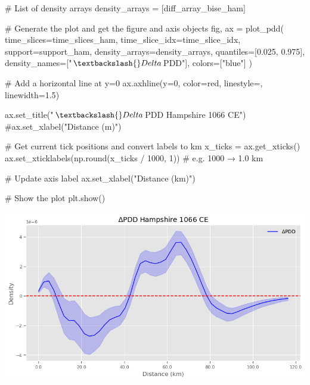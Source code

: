 \documentclass[
  11pt,
  letterpaper,
  DIV=11,
  numbers=noendperiod]{scrartcl}
\newenvironment{Shaded}{\begin{snugshade}}{\end{snugshade}}
\newcommand{\BuiltInTok}[1]{\textcolor[rgb]{0.00,0.23,0.31}{#1}}
\newcommand{\CommentTok}[1]{\textcolor[rgb]{0.37,0.37,0.37}{#1}}
\newcommand{\DecValTok}[1]{\textcolor[rgb]{0.68,0.00,0.00}{#1}}
\newcommand{\FloatTok}[1]{\textcolor[rgb]{0.68,0.00,0.00}{#1}}
\newcommand{\NormalTok}[1]{\textcolor[rgb]{0.00,0.23,0.31}{#1}}
\newcommand{\OperatorTok}[1]{\textcolor[rgb]{0.37,0.37,0.37}{#1}}
\newcommand{\StringTok}[1]{\textcolor[rgb]{0.13,0.47,0.30}{#1}}
\begin{document}
\begin{Shaded}
\begin{Highlighting}[]
\CommentTok{\# List of density arrays}
\NormalTok{density\_arrays }\OperatorTok{=}\NormalTok{ [diff\_array\_bise\_ham]}

\CommentTok{\# Generate the plot and get the figure and axis objects}
\NormalTok{fig, ax }\OperatorTok{=}\NormalTok{ plot\_pdd(}
\NormalTok{    time\_slices}\OperatorTok{=}\NormalTok{time\_slices\_ham,}
\NormalTok{    time\_slice\_idx}\OperatorTok{=}\NormalTok{time\_slice\_idx,}
\NormalTok{    support}\OperatorTok{=}\NormalTok{support\_ham,}
\NormalTok{    density\_arrays}\OperatorTok{=}\NormalTok{density\_arrays,}
\NormalTok{    quantiles}\OperatorTok{=}\NormalTok{[}\FloatTok{0.025}\NormalTok{, }\FloatTok{0.975}\NormalTok{],}
\NormalTok{    density\_names}\OperatorTok{=}\NormalTok{[}\StringTok{"$\textbackslash{}Delta$PDD"}\NormalTok{],}
\NormalTok{    colors}\OperatorTok{=}\NormalTok{[}\StringTok{"blue"}\NormalTok{]}
\NormalTok{)}

\CommentTok{\# Add a horizontal line at y=0}
\NormalTok{ax.axhline(y}\OperatorTok{=}\DecValTok{0}\NormalTok{, color}\OperatorTok{=}\StringTok{\textquotesingle{}red\textquotesingle{}}\NormalTok{, linestyle}\OperatorTok{=}\StringTok{\textquotesingle{}{-}{-}\textquotesingle{}}\NormalTok{, linewidth}\OperatorTok{=}\FloatTok{1.5}\NormalTok{)}

\NormalTok{ax.set\_title(}\StringTok{"$\textbackslash{}Delta$PDD Hampshire 1066 CE"}\NormalTok{)}
\CommentTok{\#ax.set\_xlabel("Distance (m)")}

\CommentTok{\# Get current tick positions and convert labels to km}
\NormalTok{x\_ticks }\OperatorTok{=}\NormalTok{ ax.get\_xticks()}
\NormalTok{ax.set\_xticklabels(np.}\BuiltInTok{round}\NormalTok{(x\_ticks }\OperatorTok{/} \DecValTok{1000}\NormalTok{, }\DecValTok{1}\NormalTok{))  }\CommentTok{\# e.g. 1000 → 1.0 km}

\CommentTok{\# Update axis label}
\NormalTok{ax.set\_xlabel(}\StringTok{"Distance (km)"}\NormalTok{)}

\CommentTok{\# Show the plot}
\NormalTok{plt.show()}
\end{Highlighting}
\end{Shaded}

\includegraphics{analysis_files/figure-pdf/cell-31-output-1.png}
\end{document}
